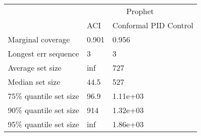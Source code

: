 \begin{tabular}{lll}
\toprule
& \multicolumn{2}{c}{Prophet} \\
& ACI & Conformal PID Control \\
\midrule
Marginal coverage & 0.901 & 0.956 \\
Longest err sequence & 3 & 3 \\
Average set size & inf & 727 \\
Median set size & 44.5 & 527 \\
75\% quantile set size & 96.9 & 1.11e+03 \\
90\% quantile set size & 914 & 1.32e+03 \\
95\% quantile set size & inf & 1.86e+03 \\
\bottomrule
\end{tabular}
